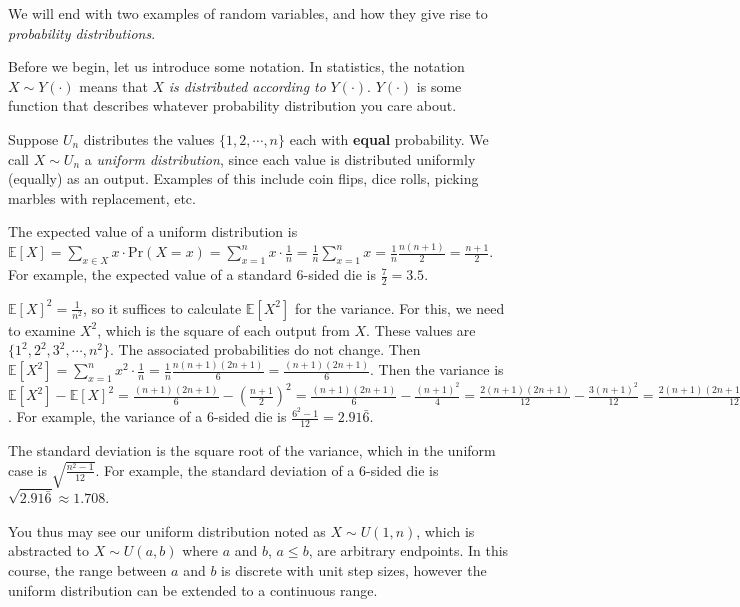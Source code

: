 \documentclass[main.tex]{subfiles}
\begin{document}
We will end with two examples of random variables, and how they give rise to \textit{probability distributions}.

\begin{rem}
	Before we begin, let us introduce some notation. In statistics, the notation \(X \sim Y(\cdot)\) means that \(X\) \textit{is distributed according to} \(Y(\cdot)\). \(Y(\cdot)\) is some function that describes whatever probability distribution you care about.
\end{rem}

\begin{example}
	Suppose \(U_n\) distributes the values \(\{1,2,\cdots,n\}\) each with \textbf{equal} probability. We call \(X \sim U_n\) a \textit{uniform distribution}, since each value is distributed uniformly (equally) as an output. Examples of this include coin flips, dice rolls, picking marbles with replacement, etc.
	
	The expected value of a uniform distribution is \(\mathbb{E}[X] = \sum_{x \in X} x \cdot \mathrm{Pr}(X = x) = \sum_{x=1}^{n} x \cdot \frac{1}{n} = \frac{1}{n}\sum_{x=1}^{n}x = \frac{1}{n}\frac{n(n+1)}{2} = \frac{n+1}{2}\). For example, the expected value of a standard 6-sided die is \(\frac{7}{2} = 3.5\).
	
	\(\mathbb{E}[X]^2 = \frac{1}{n^2}\), so it suffices to calculate \(\mathbb{E}[X^2]\) for the variance. For this, we need to examine \(X^2\), which is the square of each output from \(X\). These values are \(\{1^2,2^2,3^2,\cdots,n^2\}\). The associated probabilities do not change. Then \(\mathbb{E}[X^2] = \sum_{x=1}^{n} x^2 \cdot \frac{1}{n} = \frac{1}{n} \frac{n(n+1)(2n+1)}{6} = \frac{(n+1)(2n+1)}{6}\). Then the variance is
	\(\mathbb{E}[X^2] - \mathbb{E}[X]^2
	= \frac{(n+1)(2n+1)}{6} - (\frac{n+1}{2})^2
	= \frac{(n+1)(2n+1)}{6} - \frac{(n+1)^2}{4}
	= \frac{2(n+1)(2n+1)}{12} - \frac{3(n+1)^2}{12}
	= \frac{2(n+1)(2n+1) - 3(n+1)^2}{12}
	= \frac{(2(2n+1) - 3(n+1))(n+1)}{12}
	= \frac{(n-1)(n+1)}{12}
	= \frac{n^2-1}{12}\).
	For example, the variance of a 6-sided die is \(\frac{6^2-1}{12} = 2.91\bar{6}\).
	
	The standard deviation is the square root of the variance, which in the uniform case is \(\sqrt{\frac{n^2-1}{12}}\). For example, the standard deviation of a 6-sided die is \(\sqrt{2.91\bar{6}} \approx 1.708\).
\end{example}

\begin{rem}
	You thus may see our uniform distribution noted as \(X \sim U(1,n)\), which is abstracted to \(X \sim U(a,b)\) where \(a\) and \(b\), \(a \leq b\), are arbitrary endpoints. In this course, the range between \(a\) and \(b\) is discrete with unit step sizes, however the uniform distribution can be extended to a continuous range.
\end{rem}
\end{document}
